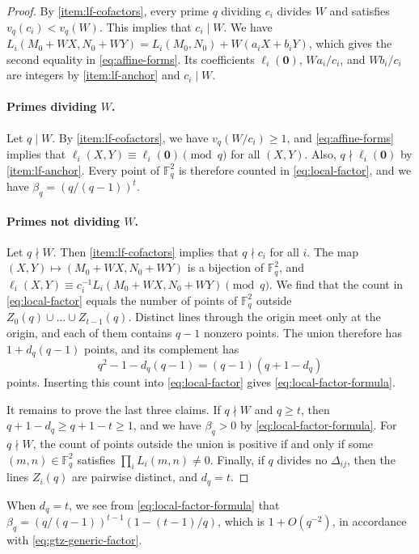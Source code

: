 \documentclass[12pt,oneside,openany]{book}
\theoremstyle{definition}
\theoremstyle{plain}
\numberwithin{equation}{chapter}
\theoremstyle{plain}
\theoremstyle{definition}
\theoremstyle{remark}
\newcommand{\F}{\mathbb F}
\begin{document}
\begin{proof}
By \ref{item:lf-cofactors}, every prime $q$ dividing $c_i$ divides $W$ and satisfies $v_q(c_i)<v_q(W)$. This implies that $c_i\mid W$. We have $L_i(M_0+WX,N_0+WY)=L_i(M_0,N_0)+W(a_iX+b_iY)$, which gives the second equality in \eqref{eq:affine-forms}. Its coefficients $\ell_i(\mathbf 0)$, $Wa_i/c_i$, and $Wb_i/c_i$ are integers by \ref{item:lf-anchor} and $c_i\mid W$.

\paragraph{Primes dividing $W$.} Let $q\mid W$. By \ref{item:lf-cofactors}, we have $v_q(W/c_i)\ge1$, and \eqref{eq:affine-forms} implies that $\ell_i(X,Y)\equiv\ell_i(\mathbf 0)\pmod q$ for all $(X,Y)$. Also, $q\nmid\ell_i(\mathbf 0)$ by \ref{item:lf-anchor}. Every point of $\F_q^2$ is therefore counted in \eqref{eq:local-factor}, and we have $\beta_q=(q/(q-1))^t$.

\paragraph{Primes not dividing $W$.} Let $q\nmid W$. Then \ref{item:lf-cofactors} implies that $q\nmid c_i$ for all $i$. The map $(X,Y)\mapsto(M_0+WX,N_0+WY)$ is a bijection of $\F_q^2$, and $\ell_i(X,Y)\equiv c_i^{-1}L_i(M_0+WX,N_0+WY)\pmod q$. We find that the count in \eqref{eq:local-factor} equals the number of points of $\F_q^2$ outside $Z_0(q)\cup\dots\cup Z_{t-1}(q)$. Distinct lines through the origin meet only at the origin, and each of them contains $q-1$ nonzero points. The union therefore has $1+d_q(q-1)$ points, and its complement has
\[
q^2-1-d_q(q-1)=(q-1)(q+1-d_q)
\]
points. Inserting this count into \eqref{eq:local-factor} gives \eqref{eq:local-factor-formula}.

It remains to prove the last three claims. If $q\nmid W$ and $q\ge t$, then $q+1-d_q\ge q+1-t\ge1$, and we have $\beta_q>0$ by \eqref{eq:local-factor-formula}. For $q\nmid W$, the count of points outside the union is positive if and only if some $(m,n)\in\F_q^2$ satisfies $\prod_iL_i(m,n)\ne0$. Finally, if $q$ divides no $\Delta_{ij}$, then the lines $Z_i(q)$ are pairwise distinct, and $d_q=t$.
\end{proof}

When $d_q=t$, we see from \eqref{eq:local-factor-formula} that $\beta_q=(q/(q-1))^{t-1}(1-(t-1)/q)$, which is $1+O(q^{-2})$, in accordance with \eqref{eq:gtz-generic-factor}.
\end{document}
